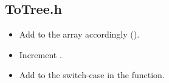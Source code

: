         \subsection*{ToTree.h}
            \begin{itemize}
                \item Add to the  array accordingly ().
                \item Increment .
                \item Add to the switch-case in the  function.
            \end{itemize}
